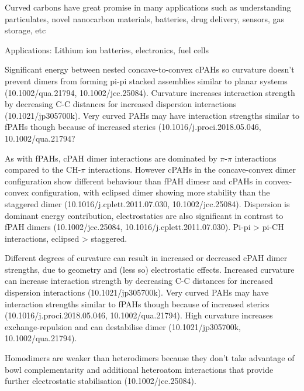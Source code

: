 Curved carbons have great promise in many applications such as understanding particulates, novel nanocarbon materials, batteries, drug delivery, sensors, gas storage, etc

Applications: Lithium ion batteries, electronics, fuel cells



Significant energy between nested concave-to-convex cPAHs so curvature doesn't prevent dimers from forming pi-pi stacked assemblies similar to planar systems (10.1002/qua.21794, 10.1002/jcc.25084). Curvature increases interaction strength by decreasing C-C distances for increased dispersion interactions (10.1021/jp305700k). Very curved PAHs may have interaction strengths similar to fPAHs though because of increased sterics (10.1016/j.proci.2018.05.046, 10.1002/qua.21794?

As with fPAHs, cPAH dimer interactions are dominated by $\pi$-$\pi$ interactions compared to the CH-$\pi$ interactions. However cPAHs in the concave-convex dimer configuration show different behaviour than fPAH dimesr and cPAHs in convex-convex configuration, with eclipsed dimer showing more stability than the staggered dimer (10.1016/j.cplett.2011.07.030, 10.1002/jcc.25084).
Dispersion is dominant energy contribution, electrostatics are also significant in contrast to fPAH dimers (10.1002/jcc.25084, 10.1016/j.cplett.2011.07.030). Pi-pi > pi-CH interactions, eclipsed > staggered.

Different degrees of curvature can result in increased or decreased cPAH dimer strengths, due to geometry and (less so) electrostatic effects. Increased curvature can increase interaction strength by decreasing C-C distances for increased dispersion interactions (10.1021/jp305700k). Very curved PAHs may have interaction strengths similar to fPAHs though because of increased sterics (10.1016/j.proci.2018.05.046, 10.1002/qua.21794). High curvature increases exchange-repulsion and can destabilise dimer (10.1021/jp305700k, 10.1002/qua.21794).

Homodimers are weaker than heterodimers because they don't take advantage of bowl complementarity and additional heteroatom interactions that provide further electrostatic stabilisation (10.1002/jcc.25084).


